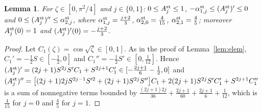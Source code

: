 \documentclass[11pt,a4paper]{article}
\newtheorem{lemma}[theorem]{Lemma}
\theoremstyle{definition}
\theoremstyle{remark}
\begin{document}
\begin{lemma}\label{lem:Ast}
For $\zeta\in[0,\pi^2/4]$ and $j\in\{0,1\}$: $0\le A^{\rm st}_j\le1$, $-\alpha^{\rm st}_{1,j}\le(A^{\rm st}_j)'\le0$ and
$0\le(A^{\rm st}_j)''\le\alpha^{\rm st}_{2,j}$, where $\alpha^{\rm st}_{1,j}=\frac{j+2}3$, $\alpha^{\rm st}_{2,0}=\frac4{15}$,
$\alpha^{\rm st}_{2,1}=\frac45$; moreover $A^{\rm st}_j(0)=1$ and $(A^{\rm st}_j)'(0)=-\frac{j+2}3$.
\end{lemma}
\begin{proof}
Let $C_1(\zeta)=\cos\sqrt\zeta\in[0,1]$. As in the proof of Lemma~\ref{lem:elem}, $C_1'=-\frac12S\in[-\frac12,0]$ and
$C_1''=-\frac12S'\in[0,\frac1{12}]$. Hence $(A^{\rm st}_j)'=(2j+1)S^{2j}S'C_1+S^{2j+1}C_1'\in[-\frac{2j+1}6-\frac12,0]$ and
$(A^{\rm st}_j)''=\bigl[(2j+1)2jS^{2j-1}S'^2+(2j+1)S^{2j}S''\bigr]C_1+2(2j+1)S^{2j}S'C_1'+S^{2j+1}C_1''$ is a sum of
nonnegative terms bounded by $\frac{(2j+1)2j}{36}+\frac{2j+1}{60}+\frac{2j+1}6+\frac1{12}$, which is $\frac4{15}$ for $j=0$
and $\frac45$ for $j=1$.
\end{proof}
\end{document}
